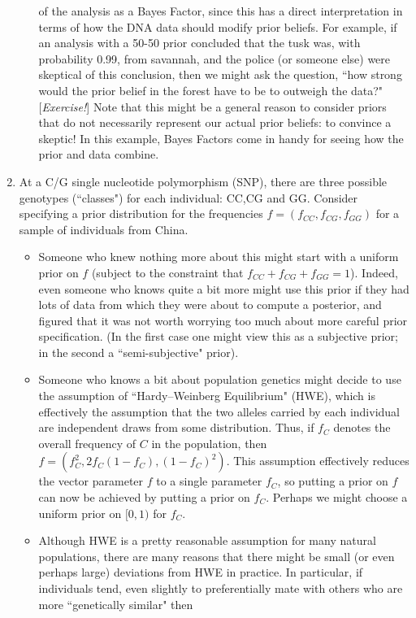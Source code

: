 \documentclass[12pt]{article}
\begin{document}
\begin{enumerate}
\begin{itemize}
  of the analysis as a Bayes Factor, since this has a direct interpretation in terms of how the DNA data should modify prior beliefs.
  For example, if an analysis with a 50-50 prior concluded that the tusk was, with probability 0.99, from savannah, and the police (or someone else) were skeptical of this conclusion, then we might ask the question, ``how strong would the prior belief in the forest have to be to outweigh the data?" [{\it Exercise!}] Note that this might be a general reason to consider priors that do not necessarily represent our actual prior beliefs: to convince a skeptic! In this example, Bayes Factors come in handy for seeing how the prior and data combine.
\end{itemize}  
  
  \def\fvec{(f_{CC},f_{CG},f_{GG})}
  
  \item At a C/G single nucleotide polymorphism (SNP), there are three possible genotypes (``classes") for each individual: CC,CG and GG. 
 Consider specifying a prior distribution for the  frequencies $f=\fvec$ for a sample of individuals from China.
 \begin{itemize}
 \item Someone who knew nothing more about this might start with a uniform prior on $f$ (subject to the constraint that $f_{CC}+f_{CG}+f_{GG}=1$). Indeed, even someone who knows quite a bit more might use this prior if they had lots of data from which they were about to compute a posterior, and figured that it was not worth worrying too much about more careful prior specification. (In the first case one might view this as a subjective prior; in the second a ``semi-subjective" prior).
 \item Someone who knows a bit about population genetics might decide to use the assumption of ``Hardy--Weinberg Equilibrium" (HWE), which is effectively the assumption that the two alleles carried by each individual are independent draws from some distribution. Thus, if $f_C$ denotes the overall frequency of $C$ in the population, then $f=(f_C^2, 2f_C(1-f_C),(1-f_C)^2)$. This assumption effectively reduces the vector parameter $f$ to a single parameter $f_C$, so
 putting a prior on $f$ can now be achieved by putting
 a prior on $f_C$. Perhaps we might choose a uniform prior on $[0,1)$ for $f_C$.
  \item Although HWE is a pretty reasonable assumption for many natural populations, there are many reasons that there might be small (or even perhaps large)
  deviations from HWE in practice. In particular, if individuals tend, even slightly to preferentially mate with others who are more ``genetically similar" then

\end{itemize}
\end{enumerate}
\end{document}
